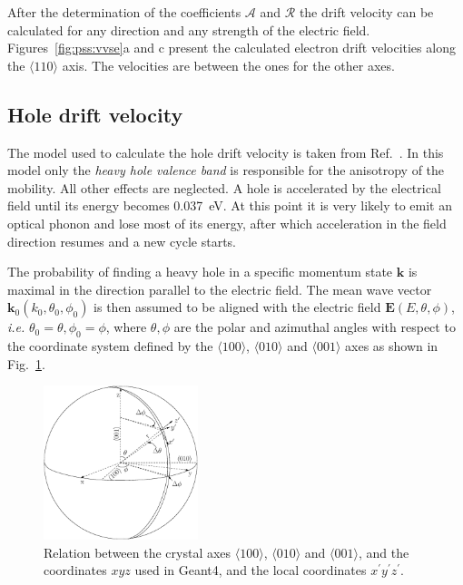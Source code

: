 After the determination of the coefficients $\mathcal{A}$ and
$\mathcal{R}$ the drift velocity can be calculated for any direction
and any strength of the electric field. Figures~\ref{fig:pss:vvse}a
and c present the calculated electron drift velocities along the
$\langle 110 \rangle$ axis. The velocities are between the ones for
the other axes.

 
\subsection{Hole drift velocity} 
\label{sec:pss:hole} 
The model used to calculate the hole drift velocity is taken from
Ref.~\cite{bart}. In this model only the \emph{heavy hole valence
band} is responsible for the anisotropy of the mobility. All other
effects are neglected. A hole is accelerated by the electrical field
until its energy becomes 0.037~eV. At this point it is very likely to
emit an optical phonon and lose most of its energy, after which
acceleration in the field direction resumes and a new cycle starts.
 
The probability of finding a heavy hole in a specific momentum state
$\mathbf{k}$ is maximal in the direction parallel to the electric
field. The mean wave vector $\mathbf{k}_{0}(k_{0}, \theta_{0},
\phi_{0})$ is then assumed to be aligned with the electric field
$\mathbf{E}(E, \theta, \phi)$, \textit{i.e.} $\theta_{0} = \theta,
\phi_{0} = \phi$, where $\theta, \phi$ are the polar and azimuthal
angles with respect to the coordinate system defined by the $\langle
100 \rangle$, $\langle 010 \rangle$ and $\langle 001 \rangle$ axes as
shown in Fig.~\ref{fig:pss:vsphere}.
 
\begin{figure} 
\centering 
\includegraphics[width=0.4\textwidth]{vsphere}   
\caption{Relation between the crystal axes $\langle100\rangle$,
$\langle010\rangle$ and $\langle001\rangle$, and the coordinates $xyz$
used in Geant4, and the local coordinates
$x^{\prime}y^{\prime}z^{\prime}$.}
\label{fig:pss:vsphere} 
\end{figure} 
 
